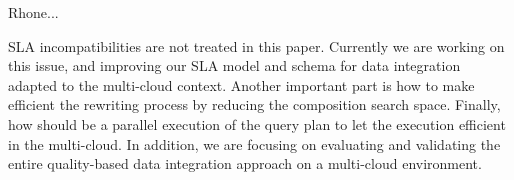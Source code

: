 Rhone...

SLA incompatibilities are not treated in this paper. Currently we are working on this issue, and improving our SLA model and schema for data integration adapted to the multi-cloud context.  Another important part is how to make efficient the rewriting process by reducing the composition search space. Finally, how should be a parallel execution of the query plan to let the execution efficient in the multi-cloud. In addition, we are focusing on evaluating and validating the entire quality-based data integration approach on a multi-cloud environment. 